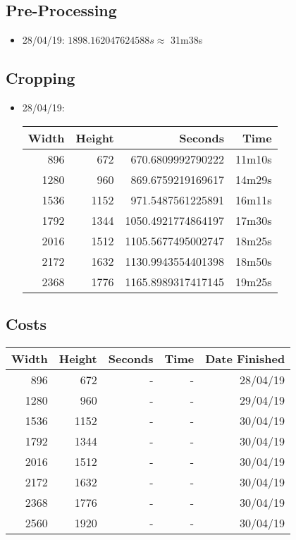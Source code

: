 \subsection{Pre-Processing}
\begin{itemize}
    \item 28/04/19: $1898.162047624588s \approx$ 31m38s
\end{itemize}

\subsection{Cropping}
\begin{itemize}
  \item 28/04/19:
  \begin{center}
  \begin{tabular}{ r r | r r }
  Width & Height & Seconds & Time\\ \hline
  896 & 672 & 670.6809992790222 & 11m10s \\
  1280 & 960 & 869.6759219169617 & 14m29s \\
  1536 & 1152 & 971.5487561225891 & 16m11s \\
  1792 & 1344 & 1050.4921774864197 & 17m30s \\
  2016 & 1512 & 1105.5677495002747 & 18m25s \\
  2172 & 1632 & 1130.9943554401398 & 18m50s \\
  2368 & 1776 & 1165.8989317417145 & 19m25s \\
  \end{tabular}
  \end{center}
\end{itemize}

\subsection{Costs}
  \begin{center}
  \begin{tabular}{ r r | r r r }
  Width & Height & Seconds & Time & Date Finished \\ \hline
  896 & 672 & - & - & 28/04/19 \\
  1280 & 960 & - & - & 29/04/19 \\
  1536 & 1152 & - & - & 30/04/19 \\
  1792 & 1344 & - & - & 30/04/19 \\
  2016 & 1512 & - & - & 30/04/19 \\
  2172 & 1632 & - & - & 30/04/19 \\
  2368 & 1776 & - & - & 30/04/19 \\
  2560 & 1920 & - & - & 30/04/19 \\
  \end{tabular}
  \end{center}

